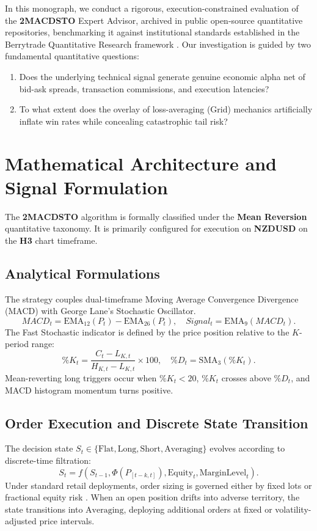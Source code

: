 \documentclass[11pt,a4paper]{article}
\begin{document}
In this monograph, we conduct a rigorous, execution-constrained evaluation of the \textbf{2MACDSTO} Expert Advisor, archived in public open-source quantitative repositories, benchmarking it against institutional standards established in the Berrytrade Quantitative Research framework \cite{artsu2026illusion}. Our investigation is guided by two fundamental quantitative questions:
\begin{enumerate}
    \item Does the underlying technical signal generate genuine economic alpha net of bid-ask spreads, transaction commissions, and execution latencies?
    \item To what extent does the overlay of loss-averaging (Grid) mechanics artificially inflate win rates while concealing catastrophic tail risk?
\end{enumerate}

\section{Mathematical Architecture and Signal Formulation}
The \textbf{2MACDSTO} algorithm is formally classified under the \textbf{Mean Reversion} quantitative taxonomy. It is primarily configured for execution on \textbf{NZDUSD} on the \textbf{H3} chart timeframe.

\subsection{Analytical Formulations}

The strategy couples dual-timeframe Moving Average Convergence Divergence (MACD) with George Lane's Stochastic Oscillator.
\begin{equation}
MACD_t = \text{EMA}_{12}(P_t) - \text{EMA}_{26}(P_t), \quad Signal_t = \text{EMA}_9(MACD_t).
\end{equation}
The Fast Stochastic indicator is defined by the price position relative to the $K$-period range:
\begin{equation}
\%K_t = \frac{C_t - L_{K, t}}{H_{K, t} - L_{K, t}} \times 100, \quad \%D_t = \text{SMA}_3(\%K_t).
\end{equation}
Mean-reverting long triggers occur when $\%K_t < 20$, $\%K_t$ crosses above $\%D_t$, and MACD histogram momentum turns positive.


\subsection{Order Execution and Discrete State Transition}
The decision state $S_t \in \{\text{Flat}, \text{Long}, \text{Short}, \text{Averaging}\}$ evolves according to discrete-time filtration:
\begin{equation}
S_{t} = f(S_{t-1}, \Phi(P_{[t-k, t]}), \text{Equity}_t, \text{MarginLevel}_t).
\end{equation}
Under standard retail deployments, order sizing is governed either by fixed lots or fractional equity risk \cite{lopez2018advances, carhart1997persistence}. When an open position drifts into adverse territory, the state transitions into $\text{Averaging}$, deploying additional orders at fixed or volatility-adjusted price intervals.
\end{document}
